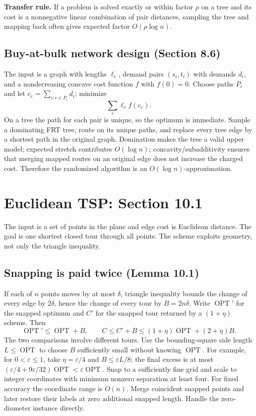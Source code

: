 \documentclass[11pt,a4paper]{article}
\newcommand{\OPT}{\operatorname{OPT}}
\newcommand{\1}{\mathbf 1}
\begin{document}
\textbf{Transfer rule.}  If a problem is solved exactly or within factor $\rho$ on a
tree and its cost is a nonnegative linear combination of pair distances, sampling the
tree and mapping back often gives expected factor $O(\rho\log n)$.

\subsection{Buy-at-bulk network design (Section 8.6)}

The input is a graph with lengths $\ell_e$, demand pairs $(s_i,t_i)$ with demands
$d_i$, and a nondecreasing concave cost function $f$ with $f(0)=0$.  Choose paths
$P_i$ and let $c_e=\sum_{i:e\in P_i}d_i$; minimize
\[
  \sum_{e}\ell_e f(c_e).
\]
On a tree the path for each pair is unique, so the optimum is immediate.  Sample a
dominating FRT tree, route on its unique paths, and replace every tree edge by a
shortest path in the original graph.  Domination makes the tree a valid upper model;
expected stretch contributes $O(\log n)$; concavity/subadditivity ensures that merging
mapped routes on an original edge does not increase the charged cost.  Therefore the
randomized algorithm is an $O(\log n)$-approximation.


\section{Euclidean TSP: Section 10.1}
The input is a set of points in the plane and edge cost is Euclidean distance.
The goal is one shortest closed tour through all points. The scheme exploits
geometry, not only the triangle inequality.
\subsection{Snapping is paid twice (Lemma 10.1)}
If each of $n$ points moves by at most $\delta$, triangle inequality bounds
the change of every edge by $2\delta$, hence the change of every tour by
$B=2n\delta$. Write $\OPT'$ for the snapped optimum and $C'$ for the
snapped tour returned by a $(1+\eta)$ scheme. Then
\[
 \OPT'\le\OPT+B,\qquad C\le C'+B
 \le(1+\eta)\OPT+(2+\eta)B.
\]
The two comparisons involve different tours. Use the bounding-square side length
$L\le\OPT$ to choose $B$ sufficiently small without knowing $\OPT$.
For example, for $0<\varepsilon\le1$, take $\eta=\varepsilon/4$ and
$B\le\varepsilon L/8$; the final excess is at most
$(\varepsilon/4+9\varepsilon/32)\OPT<\varepsilon\OPT$.
Snap to a sufficiently fine grid and scale to integer coordinates with minimum
nonzero separation at least four. For fixed accuracy the coordinate range is
$O(n)$. Merge coincident snapped points and later restore their labels at zero
additional snapped length. Handle the zero-diameter instance directly.
\end{document}
